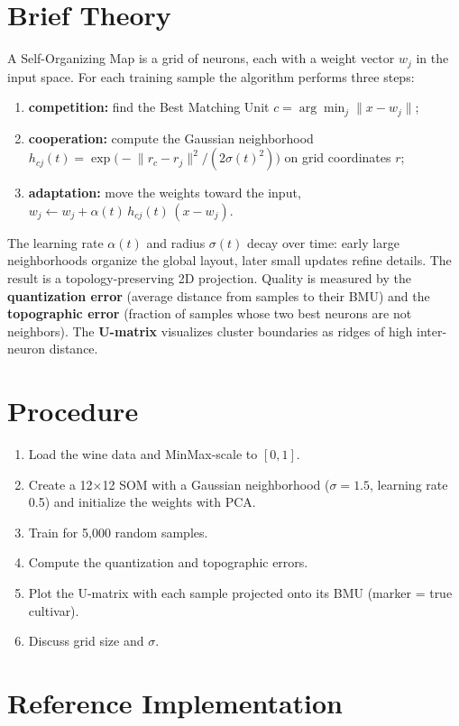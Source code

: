 \section{Brief Theory}
A Self-Organizing Map is a grid of neurons, each with a weight vector $w_j$ in the input
space. For each training sample the algorithm performs three steps:
\begin{enumerate}
  \item \textbf{competition:} find the Best Matching Unit
        $c = \arg\min_j \lVert x - w_j \rVert$;
  \item \textbf{cooperation:} compute the Gaussian neighborhood
        $h_{cj}(t) = \exp\!\bigl(-\lVert r_c - r_j\rVert^2 / (2\sigma(t)^2)\bigr)$
        on grid coordinates $r$;
  \item \textbf{adaptation:} move the weights toward the input,
        $w_j \leftarrow w_j + \alpha(t)\,h_{cj}(t)\,(x - w_j)$.
\end{enumerate}
The learning rate $\alpha(t)$ and radius $\sigma(t)$ decay over time: early large neighborhoods
organize the global layout, later small updates refine details. The result is a
topology-preserving 2D projection. Quality is measured by the \textbf{quantization error}
(average distance from samples to their BMU) and the \textbf{topographic error} (fraction of
samples whose two best neurons are not neighbors). The \textbf{U-matrix} visualizes cluster
boundaries as ridges of high inter-neuron distance.

\section{Procedure}
\begin{enumerate}
  \item Load the wine data and MinMax-scale to $[0, 1]$.
  \item Create a 12$\times$12 SOM with a Gaussian neighborhood ($\sigma = 1.5$, learning rate
        0.5) and initialize the weights with PCA.
  \item Train for 5,000 random samples.
  \item Compute the quantization and topographic errors.
  \item Plot the U-matrix with each sample projected onto its BMU (marker = true cultivar).
  \item Discuss grid size and $\sigma$.
\end{enumerate}

\section{Reference Implementation}



